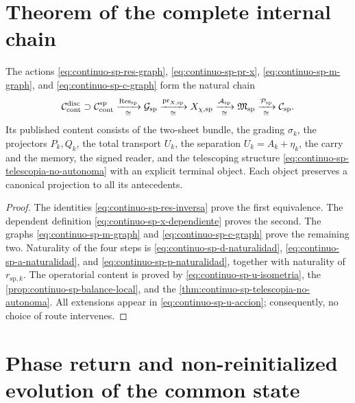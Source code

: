 \section{Theorem of the complete internal chain}

\begin{theorem}
\label{thm:continuo-sp-cadena-interna}
The actions
\eqref{eq:continuo-sp-res-graph},
\eqref{eq:continuo-sp-pr-x},
\eqref{eq:continuo-sp-m-graph}, and
\eqref{eq:continuo-sp-c-graph} form the natural chain
\begin{equation}
\label{eq:continuo-sp-cadena-interna}
 \mathcal C_{\rm cont}^{\rm disc}
 \supset\mathcal C_{\rm cont}^{\mathrm{sp}}
 \xrightarrow[\cong]{\operatorname{Res}_{\mathrm{sp}}}
 \mathcal G_{\mathrm{sp}}
 \xrightarrow[\cong]{\operatorname{pr}_{X,\mathrm{sp}}}
 X_{\chi,\mathrm{sp}}
 \xrightarrow[\cong]{\mathcal A_{\mathrm{sp}}}
 \mathfrak M_{\mathrm{sp}}
 \xrightarrow[\cong]{\mathcal P_{\mathrm{sp}}}
 \mathcal C_{\mathrm{sp}}.
\end{equation}
Its published content consists of the two-sheet bundle, the grading
\(\sigma_k\), the projectors \(P_k,Q_k\), the total transport \(U_k\),
the separation \(U_k=A_k+\eta_k\), the carry and the memory, the signed reader,
and the telescoping structure
\eqref{eq:continuo-sp-telescopia-no-autonoma} with an explicit terminal object. Each
object preserves a canonical projection to all its antecedents.
\end{theorem}

\begin{proof}
The identities
\eqref{eq:continuo-sp-res-inversa} prove the first equivalence. The
dependent definition \eqref{eq:continuo-sp-x-dependiente} proves the
second. The graphs
\eqref{eq:continuo-sp-m-graph} and
\eqref{eq:continuo-sp-c-graph} prove the remaining two. Naturality of
the four steps is
\eqref{eq:continuo-sp-d-naturalidad},
\eqref{eq:continuo-sp-a-naturalidad}, and
\eqref{eq:continuo-sp-p-naturalidad}, together with naturality of
\(r_{\mathrm{sp},k}\). The operatorial content is proved by
\eqref{eq:continuo-sp-u-isometria}, the
\cref{prop:continuo-sp-balance-local}, and the
\cref{thm:continuo-sp-telescopia-no-autonoma}. All extensions appear
in \eqref{eq:continuo-sp-u-accion}; consequently, no choice of
route intervenes.
\end{proof}

\fi
\section{Phase return and non-reinitialized evolution of the common state}

